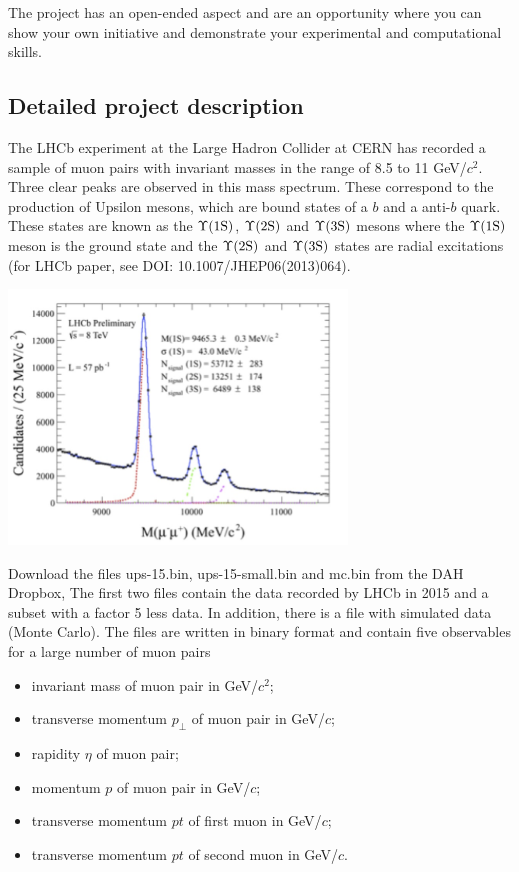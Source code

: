 The project has an open-ended aspect and are an opportunity where you can show your own initiative and demonstrate your experimental and computational skills. 

\subsection{Detailed project description}

The LHCb experiment at the Large Hadron Collider at CERN has recorded a sample of muon pairs with invariant masses in the range of 8.5 to 11 GeV/$c^2$. Three clear peaks are observed in this mass spectrum. These correspond to the production of Upsilon mesons, which are bound states of a $b$ and a anti-$b$ quark. These states are known as the $\Upsilon \rm (1S)$, $\Upsilon \rm (2S)$ and $\Upsilon \rm (3S)$ mesons where the $\Upsilon \rm (1S)$ meson is the ground state and the $\Upsilon \rm (2S)$  and $\Upsilon \rm (3S)$  states are radial excitations (for LHCb paper, see {DOI: 10.1007/JHEP06(2013)064).}

\begin{center}
    \includegraphics[width=9cm]{figs/mu-pair-mass}
\end{center}

Download the files ups-15.bin, ups-15-small.bin and mc.bin   from the DAH Dropbox, 
The first  two files contain the data recorded by LHCb in 2015 and a subset with a factor 5 less data. 
In addition, there is a file with simulated data (Monte Carlo).
The files are written in binary format and contain five observables for a large number of muon pairs
\begin{itemize}
\item  invariant mass of muon pair in   GeV/$c^2$;
\item transverse momentum $p_\perp$ of muon pair in GeV/$c$;
\item rapidity $\eta$ of muon pair;
\item  momentum $p$ of muon pair in GeV/$c$;
\item transverse momentum $pt$ of first muon in GeV/$c$;
\item transverse momentum $pt$ of second muon in GeV/$c$.
\end{itemize}

